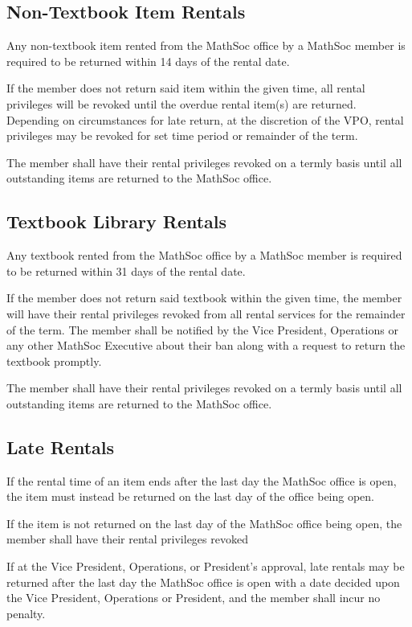 \subsection{Non-Textbook Item Rentals}

Any non-textbook item rented from the MathSoc office by a MathSoc member is required to be returned within 14 days of the rental date.

If the member does not return said item within the given time, all rental privileges will be revoked until the overdue rental item(s) are returned. Depending on circumstances for late return, at the discretion of the VPO, rental privileges may be revoked for set time period or remainder of the term.


The member shall have their rental privileges revoked on a termly basis until all outstanding items are returned to the MathSoc office.

\subsection{Textbook Library Rentals}

Any textbook rented from the MathSoc office by a MathSoc member is required to be returned within 31 days of the rental date.

If the member does not return said textbook within the given time, the member will have their rental privileges revoked from all rental services for the remainder of the term. The member shall be notified by the Vice President, Operations or any other MathSoc Executive about their ban along with a request to return the textbook promptly.

The member shall have their rental privileges revoked on a termly basis until all outstanding items are returned to the MathSoc office.

\subsection{Late Rentals}

If the rental time of an item ends after the last day the MathSoc office is open, the item must instead be returned on the last day of the office being open.

If the item is not returned on the last day of the MathSoc office being open, the member shall have their rental privileges revoked 

If at the Vice President, Operations, or President’s approval, late rentals may be returned after the last day the MathSoc office is open with a date decided upon the Vice President, Operations or President, and the member shall incur no penalty.

